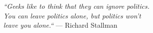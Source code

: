 \vspace*{\fill}
	\begin{flushright}
		\textit{
        ``Geeks like to think that they can ignore politics. \\
        You can leave politics alone, but politics won't \\
        leave you alone.``} --- Richard Stallman
	\end{flushright}